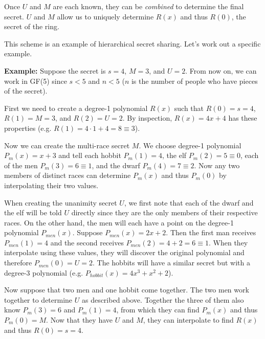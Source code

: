 \documentclass[]{article}
\begin{document}
\begin{qunlist}
\begin{enumerate}
{{Once $U$ and $M$ are each known, they can be \textit{combined} to determine the final secret. $U$ and $M$ allow us to uniquely determine $R(x)$ and thus $R(0)$, the secret of the ring.

This scheme is an example of hierarchical secret sharing. Let's work out a specific example.

\textbf{Example:} Suppose the secret is $s=4$, $M=3$, and $U=2$. From now on, we can work in GF(5) since $s<5$ and $n<5$ ($n$ is the number of people who have pieces of the secret).

First we need to create a degree-1 polynomial $R(x)$ such that $R(0)=s=4$, $R(1)=M=3$, and $R(2)=U=2$. By inspection, $R(x) = 4x + 4$ has these properties (e.g. $R(1) = 4\cdot1 + 4 = 8 \equiv 3$).

Now we can create the multi-race secret $M$. We choose degree-1 polynomial $P_m(x) = x+3$ and tell each hobbit $P_m(1)=4$, the elf $P_m(2)=5\equiv0$, each of the men $P_m(3)=6 \equiv 1$, and the dwarf $P_m(4) = 7 \equiv 2$. Now any two members of distinct races can determine $P_m(x)$ and thus $P_m(0)$ by interpolating their two values.

When creating the unanimity secret $U$, we first note that each of the dwarf and the elf will be told $U$ directly since they are the only members of their respective races. On the other hand, the men will each have a point on the degree-1 polynomial $P_{men}(x)$. Suppose $P_{men}(x) = 2x+2$. Then the first man receives $P_{men}(1) = 4$ and the second receives $P_{men}(2) = 4+2 = 6 \equiv 1$. When they interpolate using these values, they will discover the original polynomial and therefore $P_{men}(0) = U = 2$. The hobbits will have a similar secret but with a degree-3 polynomial (e.g. $P_{hobbit}(x) = 4x^3 + x^2 + 2$).

Now suppose that two men and one hobbit come together. The two men work together to determine $U$ as described above. Together the three of them also know $P_m(3)=6$ and $P_m(1)=4$, from which they can find $P_m(x)$ and thus $P_m(0) = M$. Now that they have $U$ and $M$, they can interpolate to find $R(x)$ and thus $R(0) = s = 4$.




}}
\end{enumerate}
\end{qunlist}
\end{document}
